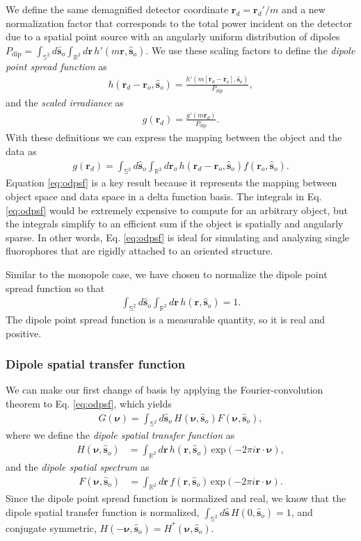 \documentclass[]{osa-article}
\providecommand{\mb}[1]{\mathbf{#1}}
\providecommand{\ro}{\mathbf{\mathbf{r}}_o}
\providecommand{\so}{\mathbf{\hat{s}}_o}
\providecommand{\rd}{\mathbf{r}_d}
\providecommand{\mh}[1]{\mathbf{\hat{#1}}}
\providecommand{\mbb}[1]{\mathbb{#1}}
\providecommand{\bs}[1]{\boldsymbol{#1}}
\providecommand{\bv}{\bs{\nu}}
\begin{document}
We define the same demagnified detector coordinate $\rd = \rd'/m$ and a new
normalization factor that corresponds to the total power incident on the
detector due to a spatial point source with an angularly uniform distribution of
dipoles
$P_\text{dip} = \int_{\mbb{S}^2}d\so\int_{\mbb{R}^2}d\mb{r}\, h'(m\mb{r},
\so)$. We use these scaling factors to define the
\textit{dipole point spread function} as
\begin{align}
  h(\rd - \ro, \so) = \frac{h'(m[\rd - \ro], \so)}{P_\text{dip}}, 
\end{align}
and the \textit{scaled irradiance} as 
\begin{align}
  g(\rd) = \frac{g'(m\rd)}{P_\text{dip}}. 
\end{align}
With these definitions we can express the mapping between the object and the
data as
\begin{align}
g(\rd{}) = \int_{\mbb{S}^2}d\so{}\int_{\mbb{R}^2}d\ro{}\, h(\rd{} -\ro{}, \so{})f(\ro, \so). \label{eq:odpsf}
\end{align}
Equation \eqref{eq:odpsf} is a key result because it represents the mapping
between object space and data space in a delta function basis. The integrals in
Eq. \eqref{eq:odpsf} would be extremely expensive to compute for an arbitrary
object, but the integrals simplify to an efficient sum if the object is
spatially and angularly sparse. In other words, Eq. \eqref{eq:odpsf} is ideal for
simulating and analyzing single fluorophores that are rigidly attached to an
oriented structure.

Similar to the monopole case, we have chosen to normalize the dipole point
spread function so that
\begin{align}
  \int_{\mbb{S}^2}d\so\int_{\mbb{R}^2}d\mb{r}\, h(\mb{r}, \so) = 1. 
\end{align}
The dipole point spread function is a measurable quantity, so it is real
and positive.

\subsubsection{Dipole spatial transfer function}
We can make our first change of basis by applying the Fourier-convolution
theorem to Eq. \eqref{eq:odpsf}, which yields
\begin{align}
G(\bv) = \int_{\mbb{S}^2}d\so\, H(\bv, \so)F(\bv, \so) \label{eq:odotf},
\end{align}
where we define the \textit{dipole spatial transfer function} as
  \begin{align}
  H(\bv, \so) &= \int_{\mbb{R}^2}d\mb{r}\, h(\mb{r}, \so)\, \text{exp}(-2\pi i\mb{r}\cdot\bv),\label{eq:dstf}
  \end{align}
  and the \textit{dipole spatial spectrum} as
  \begin{align}
  F(\bv, \so) &= \int_{\mbb{R}^2}d\mb{r}\, f(\mb{r}, \so)\, \text{exp}(-2\pi i\mb{r}\cdot\bv). 
  \end{align}
  Since the dipole point spread function is normalized and real, we know that
  the dipole spatial transfer function is normalized,
  $\int_{\mbb{S}^2}d\mh{s}\, H(0, \so) = 1$, and conjugate symmetric,
  $H(-\bv, \so) = H^*(\bv, \so)$.
  
\end{document}
